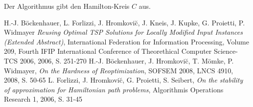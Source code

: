 \documentclass[a4paper,11pt]{scrreprt}
\begin{document}
Der Algorithmus gibt den Hamilton-Kreis $C$ aus.

\begin{thebibliography}{9}

  H.-J. Böckenhauer, L. Forlizzi, J. Hromkovi\u{c}, J. Kneis, J. Kupke, G. Proietti, P. Widmayer 
  \emph{Reusing Optimal TSP Solutions for Locally Modified Input Instances (Extended Abstract)},
  International Federation for Information Processing, Volume 209, Fourth IFIP International Conference of Theorethical Computer Science-TCS 2006, 2006, S. 251-270
  H.-J. Böckenhauer, J. Hromkovi\u{c}, T. Mömke, P. Widmayer,
  \emph{On the Hardness of Reoptimization},
  SOFSEM 2008, LNCS 4910, 2008, S. 50-65
  L. Forlizzi, J. Hromkovi\u{c}, G. Proietti, S. Seibert,
  \emph{On the stability of approximation for Hamiltonian path problems},
  Algorithmis Operations Research 1, 2006, S. 31-45

\end{thebibliography}
  
\end{document}

